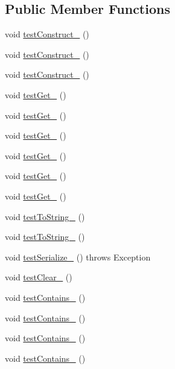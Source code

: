 \subsection*{Public Member Functions}
\begin{DoxyCompactItemize}
\item 
void \hyperlink{classorg_1_1jgap_1_1distr_1_1_culture_test_aaa81d37541511e2e6d712df4b2cbe712}{test\-Construct\-\_} ()
\item 
void \hyperlink{classorg_1_1jgap_1_1distr_1_1_culture_test_a92f5659ff5a42c73bca0ced553994c72}{test\-Construct\-\_} ()
\item 
void \hyperlink{classorg_1_1jgap_1_1distr_1_1_culture_test_a836b4daa710f224404b8abc9c9070fb5}{test\-Construct\-\_} ()
\item 
void \hyperlink{classorg_1_1jgap_1_1distr_1_1_culture_test_aa060bf05c2c9e0ce2be4abe85772cba2}{test\-Get\-\_} ()
\item 
void \hyperlink{classorg_1_1jgap_1_1distr_1_1_culture_test_a278d45a22e6c7b609de114d453486f6f}{test\-Get\-\_} ()
\item 
void \hyperlink{classorg_1_1jgap_1_1distr_1_1_culture_test_a365a8797f42103cec3d6545bfd151a2c}{test\-Get\-\_} ()
\item 
void \hyperlink{classorg_1_1jgap_1_1distr_1_1_culture_test_a22e79c0ddde074ed4d4cdeb467cbc965}{test\-Get\-\_} ()
\item 
void \hyperlink{classorg_1_1jgap_1_1distr_1_1_culture_test_a22106a78658168751e84a46483206808}{test\-Get\-\_} ()
\item 
void \hyperlink{classorg_1_1jgap_1_1distr_1_1_culture_test_acd1ecf423d23b5adf5212007a2548841}{test\-Get\-\_} ()
\item 
void \hyperlink{classorg_1_1jgap_1_1distr_1_1_culture_test_acf7348d3ae0d7e9458bb505a65f26af3}{test\-To\-String\-\_} ()
\item 
void \hyperlink{classorg_1_1jgap_1_1distr_1_1_culture_test_a6d9643ccf90e461089fb2f6c8d7be6de}{test\-To\-String\-\_} ()
\item 
void \hyperlink{classorg_1_1jgap_1_1distr_1_1_culture_test_a02d17b852fb4a53785160271d77b908b}{test\-Serialize\-\_} ()  throws Exception 
\item 
void \hyperlink{classorg_1_1jgap_1_1distr_1_1_culture_test_afba7613a75ac2c0c3cfa2ece4966f152}{test\-Clear\-\_} ()
\item 
void \hyperlink{classorg_1_1jgap_1_1distr_1_1_culture_test_acd3eb3ee28bc3b9cb10765295d9c2c37}{test\-Contains\-\_} ()
\item 
void \hyperlink{classorg_1_1jgap_1_1distr_1_1_culture_test_a49ca76141d9d534381938a1d420e7b1a}{test\-Contains\-\_} ()
\item 
void \hyperlink{classorg_1_1jgap_1_1distr_1_1_culture_test_a6e6056d02285d5ed920d7a2a917f3e1c}{test\-Contains\-\_} ()
\item 
void \hyperlink{classorg_1_1jgap_1_1distr_1_1_culture_test_aad6430df74838f307d1f1af9953dbc30}{test\-Contains\-\_} ()
\end{DoxyCompactItemize}
